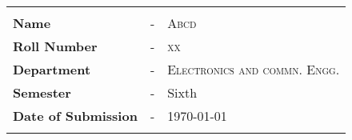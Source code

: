 
\begin{tabular}{|l l l|}
    \hline
    & &\\
    





   
    \large{\textbf{Name }} & - &
    
    \large{\textsc{Abcd}}\\ %
    
    
    \large{\textbf{Roll Number}} & - &
    
    \large{\textsc{xx}}\\ %
    
    
    \large{\textbf{Department}} & - &
    \large{\textsc{Electronics and commn. Engg.}}\\ 
    
    \large{\textbf{Semester}} & - &
    \large{Sixth}\\ 
    
    \large{\textbf{Date of Submission}} & - &
    \large{\today}\\ %
    







    & &\\
    \hline
\end{tabular}

